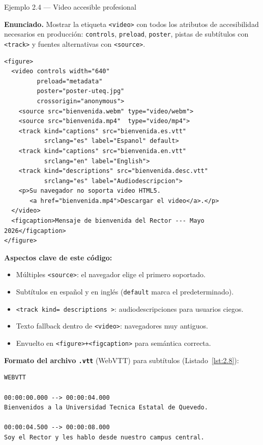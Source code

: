 \begin{cajaejemplo}{Ejemplo 2.4 --- Video accesible profesional}

\textbf{Enunciado.} Mostrar la etiqueta \texttt{<video>} con todos los atributos de accesibilidad necesarios en producción: \texttt{controls}, \texttt{preload}, \texttt{poster}, pistas de subtítulos con \texttt{<track>} y fuentes alternativas con \texttt{<source>}.

\begin{lstlisting}[style=html,caption={Ejemplo de HTML},label=lst:2.7]
<figure>
  <video controls width="640"
         preload="metadata"
         poster="poster-uteq.jpg"
         crossorigin="anonymous">
    <source src="bienvenida.webm" type="video/webm">
    <source src="bienvenida.mp4"  type="video/mp4">
    <track kind="captions" src="bienvenida.es.vtt"
           srclang="es" label="Espanol" default>
    <track kind="captions" src="bienvenida.en.vtt"
           srclang="en" label="English">
    <track kind="descriptions" src="bienvenida.desc.vtt"
           srclang="es" label="Audiodescripcion">
    <p>Su navegador no soporta video HTML5.
       <a href="bienvenida.mp4">Descargar el video</a>.</p>
  </video>
  <figcaption>Mensaje de bienvenida del Rector --- Mayo 2026</figcaption>
</figure>
\end{lstlisting}

\textbf{Aspectos clave de este código:}
\begin{itemize}
\item Múltiples \texttt{<source>}: el navegador elige el primero
soportado.
\item Subtítulos en español y en inglés (\texttt{default} marca el
predeterminado).
\item \texttt{<track kind= descriptions >}: audiodescripciones para
usuarios ciegos.
\item Texto fallback dentro de \texttt{<video>}: navegadores muy
antiguos.
\item Envuelto en \texttt{<figure>+<figcaption>} para semántica
correcta.
\end{itemize}

\textbf{Formato del archivo \texttt{.vtt}} (WebVTT) para subtítulos (Listado~\ref{lst:2.8}):
\begin{lstlisting}[style=shell,caption={bienvenida.es.vtt},label=lst:2.8]
WEBVTT

00:00:00.000 --> 00:00:04.000
Bienvenidos a la Universidad Tecnica Estatal de Quevedo.

00:00:04.500 --> 00:00:08.000
Soy el Rector y les hablo desde nuestro campus central.
\end{lstlisting}
\end{cajaejemplo}

